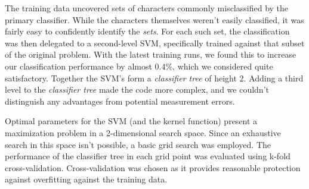 \documentclass{netsec2012}
\begin{document}
The training data uncovered sets of characters commonly misclassified by the primary classifier. 
While the characters themselves weren't easily classified, it was fairly easy to confidently 
identify the \emph{sets}.  For each such set, the classification was then delegated to a 
second-level SVM, specifically trained against that subset of the original problem.  With the 
latest training runs, we found this to increase our classification performance by almost 0.4\%, 
which we considered quite satisfactory. Together the SVM's form a \emph{classifier tree} of 
height 2. Adding a third level to the \emph{classifier tree} made the code more complex, and we couldn't
distinguish any advantages from potential measurement errors.

Optimal parameters for the SVM (and the kernel function) present a maximization problem in a
2-dimensional search space.  Since an exhaustive search in this space isn't possible,
a basic grid search was employed.  The performance of the classifier tree in each grid point
was evaluated using k-fold cross-validation.  Cross-validation was chosen as it provides
reasonable protection against overfitting against the training data.

\end{document}
